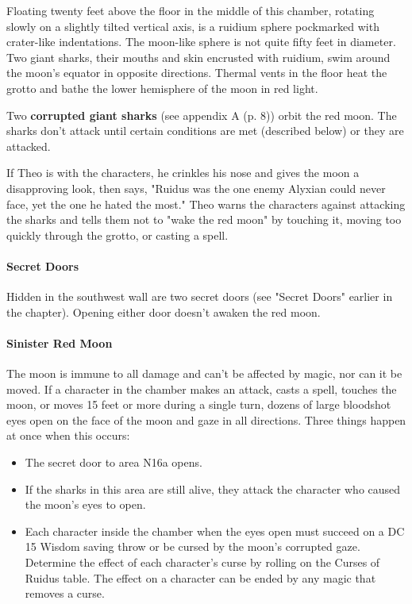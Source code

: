 \documentclass[a4paper, 11pt, bg=full, twocolumn, nooutline]{dndbook}
\begin{document}
\begin{DndReadAloud}
Floating twenty feet above the floor in the middle of this chamber, rotating slowly on a slightly tilted vertical axis, is a ruidium sphere pockmarked with crater-like indentations. The moon-like sphere is not quite fifty feet in diameter. Two giant sharks, their mouths and skin encrusted with ruidium, swim around the moon's equator in opposite directions. Thermal vents in the floor heat the grotto and bathe the lower hemisphere of the moon in red light.
\end{DndReadAloud}

Two \textbf{corrupted giant sharks} (see appendix A (p. 8)) orbit the red moon. The sharks don't attack until certain conditions are met (described below) or they are attacked.

If Theo is with the characters, he crinkles his nose and gives the moon a disapproving look, then says, "Ruidus was the one enemy Alyxian could never face, yet the one he hated the most." Theo warns the characters against attacking the sharks and tells them not to "wake the red moon" by touching it, moving too quickly through the grotto, or casting a spell.

\paragraph{Secret Doors}

Hidden in the southwest wall are two secret doors (see "Secret Doors" earlier in the chapter). Opening either door doesn't awaken the red moon.

\paragraph{Sinister Red Moon}

The moon is immune to all damage and can't be affected by magic, nor can it be moved. If a character in the chamber makes an attack, casts a spell, touches the moon, or moves 15 feet or more during a single turn, dozens of large bloodshot eyes open on the face of the moon and gaze in all directions. Three things happen at once when this occurs:

\begin{itemize}
\item The secret door to area N16a opens.
\item If the sharks in this area are still alive, they attack the character who caused the moon's eyes to open.
\item Each character inside the chamber when the eyes open must succeed on a DC 15 Wisdom saving throw or be cursed by the moon's corrupted gaze. Determine the effect of each character's curse by rolling on the Curses of Ruidus table. The effect on a character can be ended by any magic that removes a curse.
\end{itemize}
\end{document}
